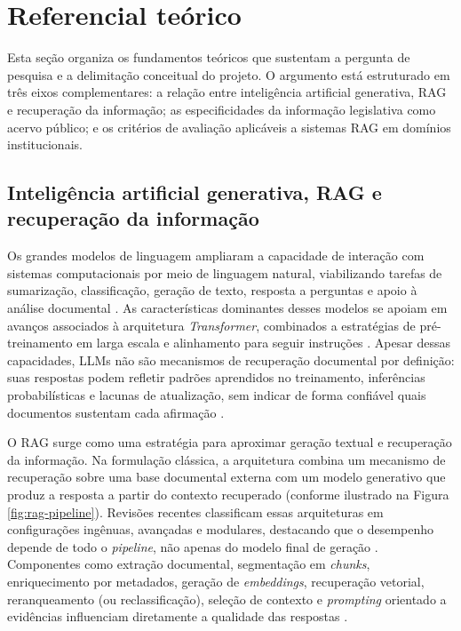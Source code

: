 \section{Referencial teórico}\label{sec:referencial}

Esta seção organiza os fundamentos teóricos que sustentam a pergunta de pesquisa e a delimitação conceitual do projeto. O argumento está estruturado em três eixos complementares: a relação entre inteligência artificial generativa, RAG e recuperação da informação; as especificidades da informação legislativa como acervo público; e os critérios de avaliação aplicáveis a sistemas RAG em domínios institucionais.

\subsection{Inteligência artificial generativa, RAG e recuperação da informação}

Os grandes modelos de linguagem ampliaram a capacidade de interação com sistemas computacionais por meio de linguagem natural, viabilizando tarefas de sumarização, classificação, geração de texto, resposta a perguntas e apoio à análise documental \parencite{brownEtAl2020fewShotLearners, zhaoEtAl2023llmSurvey,minaee2024llmSurvey}. As características dominantes desses modelos se apoiam em avanços associados à arquitetura \textit{Transformer}, combinados a estratégias de pré-treinamento em larga escala e alinhamento para seguir instruções \parencite{vaswani2017attention,brownEtAl2020fewShotLearners,ouyangEtAl2022instructGpt}. Apesar dessas capacidades, LLMs não são mecanismos de recuperação documental por definição: suas respostas podem refletir padrões aprendidos no treinamento, inferências probabilísticas e lacunas de atualização, sem indicar de forma confiável quais documentos sustentam cada afirmação \parencite{jiEtAl2023hallucinationSurvey,anhHoang2025hallucinations,dahlEtAl2024largeLegalFictions}.

O RAG surge como uma estratégia para aproximar geração textual e recuperação da informação. Na formulação clássica, a arquitetura combina um mecanismo de recuperação sobre uma base documental externa com um modelo generativo que produz a resposta a partir do contexto recuperado \parencite{lewisEtAl2020rag} (conforme ilustrado na Figura \ref{fig:rag-pipeline}). Revisões recentes classificam essas arquiteturas em configurações ingênuas, avançadas e modulares, destacando que o desempenho depende de todo o \textit{pipeline}, não apenas do modelo final de geração \parencite{gao2023ragSurvey,gao2024modularRag}. Componentes como extração documental, segmentação em \textit{chunks}, enriquecimento por metadados, geração de \textit{embeddings}, recuperação vetorial, reranqueamento (ou reclassificação), seleção de contexto e \textit{prompting} orientado a evidências influenciam diretamente a qualidade das respostas \parencite{gupta2024comprehensiveRag, nie2024textEmbeddingSurvey}. 

